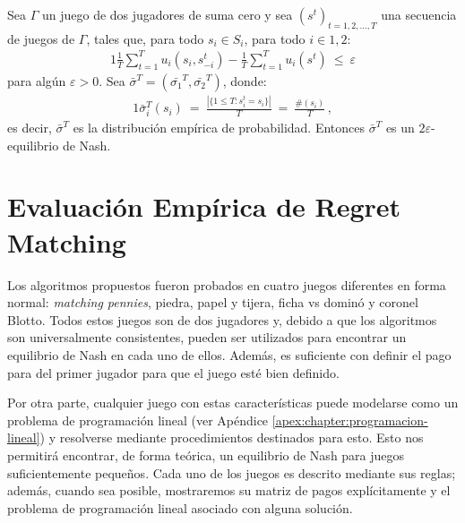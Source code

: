 \begin{theorem}
\label{theo:UC-EN}
Sea $\Gamma$ un juego de dos jugadores de suma cero y sea $(s^t)_{t=1,2,..., T}$ una secuencia de juegos de $\Gamma$, tales que, para todo $s_i \in S_i$, para todo $i \in {1, 2}$:
\begin{alignat}{1}
\frac{1}{T}\sum_{t = 1}^{T}u_i(s_i, s_{-i}^t) - \frac{1}{T} \sum_{t = 1}^T u_i(s^t)\ \leq\ \varepsilon
\end{alignat}
para algún $\varepsilon > 0$. Sea $\bar{\sigma}^T = (\bar{\sigma_1}^T, \bar{\sigma_2}^T)$, donde:
\begin{alignat}{1}
\bar{\sigma}_i^T(s_i)\ =\ \frac{ |\{ 1 \leq T : s_i^t = s_i\}|}{T}\ =\ \frac{\#(s_i)}{T} \,,
\end{alignat}
es decir, $\bar{\sigma}^T$ es la distribución empírica de probabilidad. Entonces $\bar{\sigma}^T$ es un $2\varepsilon$-equilibrio de Nash.
\end{theorem}

\section{Evaluación Empírica de Regret Matching}

Los algoritmos propuestos fueron probados en cuatro juegos diferentes en forma normal: \textit{matching pennies}, piedra, papel y tijera, ficha vs dominó y coronel Blotto. Todos estos juegos son de dos jugadores y, debido a que los algoritmos son universalmente consistentes, pueden ser utilizados para encontrar un equilibrio de Nash en cada uno de ellos. Además, es suficiente con definir el pago para del primer jugador para que el juego esté bien definido. 

Por otra parte, cualquier juego con estas características puede modelarse como un problema de programación lineal \cite[pp.~228-233]{bib:pl-chvatal} (ver Apéndice \ref{apex:chapter:programacion-lineal}) y resolverse mediante procedimientos destinados para esto. Esto nos permitirá encontrar, de forma teórica, un equilibrio de Nash para juegos suficientemente pequeños. Cada uno de los juegos es descrito mediante sus reglas; además, cuando sea posible, mostraremos su matriz de pagos explícitamente y el problema de programación lineal asociado con alguna solución.


